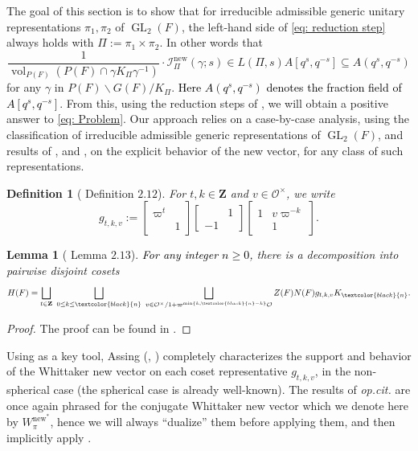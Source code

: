 \documentclass{amsart}
\theoremstyle{plain}
\newtheorem{lem}[thm]{Lemma}
\theoremstyle{plain}
\newtheorem{defn}[thm]{Definition}
\theoremstyle{remark}
\DeclareMathOperator{\GL}{GL}
\DeclareMathOperator{\vol}{vol}
\begin{document}
The goal of this section is to show that for irreducible admissible generic unitary representations $\pi_1,\pi_2$ of $\GL_2(F)$, the left-hand side of \eqref{eq: reduction step} always holds with $\Pi:=\pi_1\times \pi_2$. In other words that
$$\frac{1}{\vol_{P(F)}(P(F)\cap \gamma K_\Pi\gamma^{-1})}\cdot\mathcal{I}_{\Pi}^\mathrm{new}(\gamma ;s)\in L(\Pi,s)A[q^s,q^{-s}]\subseteq A(q^s,q^{-s})$$
for any $\gamma$ in $P(F)\backslash G(F)/K_\Pi$. \textcolor{black}{Here $A(q^s,q^{-s})$ denotes the fraction field of $A[q^s,q^{-s}]$}. From this, using the reduction steps of , we will obtain a positive answer to \eqref{eq: Problem}. Our approach relies on a case-by-case analysis, using the classification of irreducible admissible generic representations of $\GL_2(F)$, and results of \cite{Assing_2018}, \cite{Assing_2019} and \cite{Saha_2015}, on the explicit behavior of the new vector, for any class of such representations.
\begin{defn}[\cite{Saha_2015} Definition $2.12$]
    For $t,k\in\mathbf{Z}$ and $v\in\mathcal{O}^\times$, we write $$g_{t,k,v}:=\left[\begin{smallmatrix}
        \varpi^t & \\
        & 1
    \end{smallmatrix}\right]\left[\begin{smallmatrix}
        & 1 \\
        -1 &
    \end{smallmatrix}\right]\left[\begin{smallmatrix} 
    1 & v\varpi^{-k}\\
    & 1
    \end{smallmatrix}\right].$$
\end{defn}
\begin{lem}[\cite{Saha_2015} Lemma $2.13$]\label{lem general coset decomp}
\textcolor{black}{For any integer $n\geq 0$,} there is a decomposition into pairwise disjoint cosets
$$H(F)=\bigsqcup_{t\in\mathbf{Z}}\ \bigsqcup_{0\leq k\leq \textcolor{black}{n}}\ \bigsqcup_{v\in\mathcal{O}^\times/1+\varpi^{\mathrm{min}\{k,\textcolor{black}{n}-k\}}\mathcal{O}} Z(F)N(F)g_{t,k,v} K_{\textcolor{black}{n}}.$$
\end{lem}
\begin{proof}
    The proof can be found in \cite[\S $3.3$]{cesnavicius2022manin}.
\end{proof}
Using \cite[Proposition $2.23$]{Saha_2015}  as a key tool, Assing (\cite{Assing_2018}, \cite{Assing_2019}) completely characterizes the support and behavior of the Whittaker new vector on each coset representative $g_{t,k,v}$, in the non-spherical case (the spherical case is already well-known). The results of \textit{op.cit.} are once again phrased for the conjugate Whittaker new vector which we denote here by $W_\pi^{\mathrm{new}^*}$, hence we will always ``dualize'' them before applying them, and then implicitly apply . 
\end{document}
